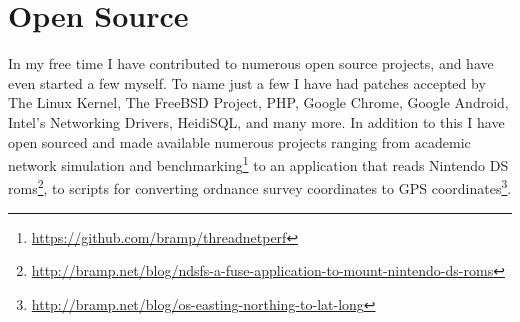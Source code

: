 \documentclass[letterpaper,10pt]{article}
\begin{document}
\begin{tabularx}{\textwidth}{r|X}


\end{tabularx}


\section{Open Source}
 In my free time I have contributed to numerous open source projects, and have even started a few myself. To name just a few I have had patches accepted by 
The Linux Kernel, The FreeBSD Project, PHP, Google Chrome, Google Android, Intel's Networking Drivers, HeidiSQL, and many more. In addition to this I have open sourced and made 
available numerous projects ranging from academic network simulation and benchmarking\footnote{\href{https://github.com/bramp/threadnetperf}{https://github.com/bramp/threadnetperf}} to an application that reads Nintendo DS 
roms\footnote{\href{http://bramp.net/blog/ndsfs-a-fuse-application-to-mount-nintendo-ds-roms}{http://bramp.net/blog/ndsfs-a-fuse-application-to-mount-nintendo-ds-roms}}, 
to scripts for converting ordnance survey coordinates to GPS 
coordinates\footnote{\href{http://bramp.net/blog/os-easting-northing-to-lat-long}{http://bramp.net/blog/os-easting-northing-to-lat-long}}.


\end{document}
